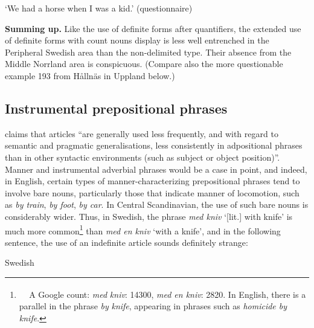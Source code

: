 \begin{styleTranslation}
‘We had a horse when I was a kid.’ (questionnaire)

\end{styleTranslation}

\begin{styleBodytextC}
\textbf{Summing up.} Like the use of definite forms after quantifiers, the extended use of definite forms with count nouns display is less well entrenched in the Peripheral Swedish area than the non-delimited type. Their absence from the Middle Norrland area is conspicuous. (Compare also the more questionable example 193 from Hållnäs in Uppland below.)

\end{styleBodytextC}

\subsection{\rmfamily Instrumental prepositional phrases }

\begin{styleBodyTextFirst}
\citet{Himmelmann1998} claims that articles “are generally used less frequently, and with regard to semantic and pragmatic generalisations, less consistently in adpositional phrases than in other syntactic environments (such as subject or object position)”. Manner and instrumental adverbial phrases would be a case in point, and indeed, in English, certain types of manner-characterizing prepositional phrases tend to involve bare nouns, particularly those that indicate manner of locomotion, such as \textit{by train}, \textit{by foot}, \textit{by car}. In Central Scandinavian, the use of such bare nouns is considerably wider. Thus, in Swedish, the phrase \textit{med kniv} ‘[lit.] with knife’ is much more common\footnote{\textsuperscript{\ \ } A Google count: \textit{med }\textit{kniv}: 14300, \textit{med en kniv}: 2820. In English, there is a parallel in the phrase \textit{by} \textit{knife}, appearing in phrases such as \textit{homicide by knife}.} than \textit{med en kniv }‘with a knife’, and in the following sentence, the use of an indefinite article sounds definitely strange:

\end{styleBodyTextFirst}

\begin{listWWNumileveli}
\item {}

\begin{styleExample}
\label{bkm:Ref224115033}Swedish

\end{styleExample}

\end{listWWNumileveli}

